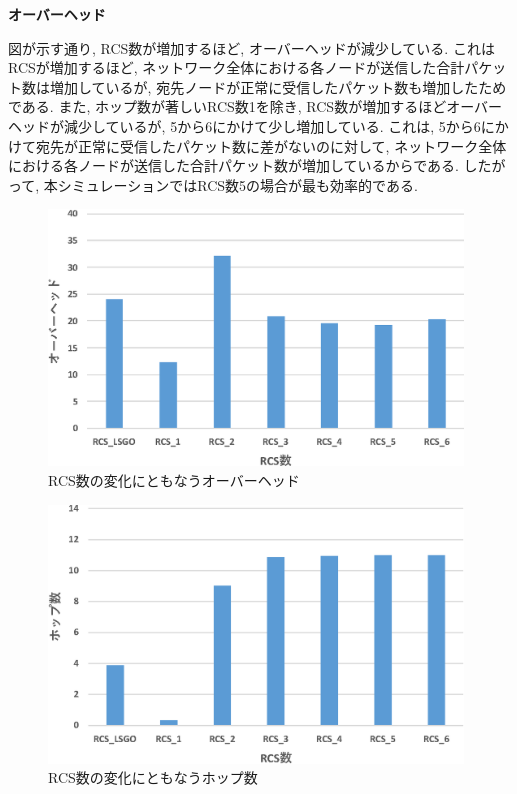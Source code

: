 \documentclass[10pt]{jreport}
\begin{document}
\par
\vspace{5mm}
\noindent
\textbf{オーバーヘッド}
\vspace{5mm}

図が示す通り, RCS数が増加するほど, オーバーヘッドが減少している. これはRCSが増加するほど, ネットワーク全体における各ノードが送信した合計パケット数は増加しているが, 宛先ノードが正常に受信したパケット数も増加したためである. また, ホップ数が著しいRCS数1を除き, RCS数が増加するほどオーバーヘッドが減少しているが, 5から6にかけて少し増加している. これは, 5から6にかけて宛先が正常に受信したパケット数に差がないのに対して, ネットワーク全体における各ノードが送信した合計パケット数が増加しているからである. したがって, 本シミュレーションではRCS数5の場合が最も効率的である. 

\begin{figure}[!ht]
	\centering
	\includegraphics[width=110mm]{figures/RCS_Overhead.eps}
	\caption{RCS数の変化にともなうオーバーヘッド}
	\label{fig:RCS-overhead}
\end{figure}

\begin{figure}[!ht]
	\centering
	\includegraphics[width=110mm]{figures/RCS_Hop.eps}
	\caption{RCS数の変化にともなうホップ数}
	\label{fig:RCS-hop}
\end{figure}
\end{document}
